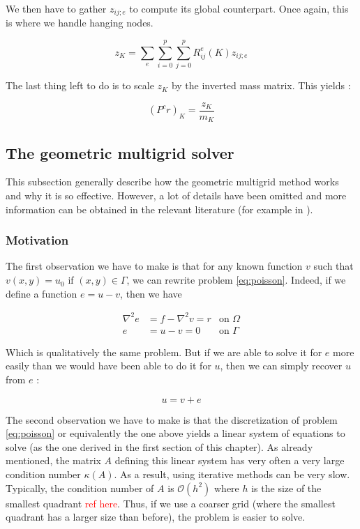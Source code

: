 We then have to gather $z_{ij;e}$ to compute its global counterpart. Once again, this is where we handle hanging nodes.

$$z_{K} = \sum_e\sum_{i=0}^p\sum_{j=0}^p R^e_{ij}(K)z_{ij;e}$$

The last thing left to do is to scale $z_K$ by the inverted mass matrix. This yields : 

$$(P^cr)_K = \frac{z_K}{m_K}$$

\subsection{The geometric multigrid solver}

This subsection generally describe how the geometric multigrid method works and why it is so effective. However, a lot of details have been omitted and more information can be obtained in the relevant literature (for example in \cite{multi_book}).

\subsubsection{Motivation}

The first observation we have to make is that for any known function $v$ such that $v(x,y)=u_0$ if $(x,y) \in \Gamma$, we can rewrite problem \ref{eq:poisson}. Indeed, if we define a function $e = u-v$, then we have

\begin{align}
\nabla ^2 e &= f-\nabla^2v = r &\text{on $\Omega$} \label{eq:poisson_error}\\
e &= u-v = 0 &\text{on $\Gamma$}
\end{align}

Which is qualitatively the same problem. But if we are able to solve it for $e$ more easily than we would have been able to do it for $u$, then we can simply recover $u$ from $e$ : 

$$u = v + e$$

The second observation we have to make is that the discretization of problem \ref{eq:poisson} or equivalently the one above yields a linear system of equations to solve (as the one derived in the first section of this chapter). As already mentioned, the matrix $A$ defining this linear system has very often a very large condition number $\kappa(A)$. As a result, using iterative methods can be very slow. Typically, the condition number of $A$ is $\mathcal{O}(h^2)$ where $h$ is the size of the smallest quadrant \textcolor{red}{ref here}. Thus, if we use a coarser grid (where the smallest quadrant has a larger size than before), the problem is easier to solve. 

